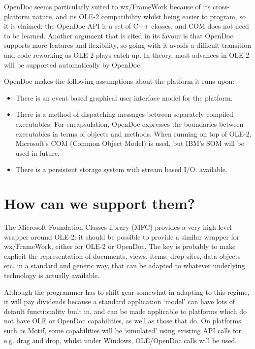 OpenDoc seems particularly suited to wx/FrameWork because of its
cross-platform nature, and its OLE-2 compatibility whilst being easier
to program, so it is claimed: the OpenDoc API is a set of C++
classes, and COM does not need to be learned. Another argument that is
cited in its favour is that OpenDoc supports more features and
flexibility, so going with it avoids a difficult transition and code
reworking as OLE-2 plays catch-up. In theory, most advances in OLE-2
will be supported automatically by OpenDoc.

OpenDoc makes the following assumptions about the platform it runs upon:

\begin{itemize}
\item There is an event based graphical user interface model for the platform.
\item There is a method of dispatching messages between separately compiled
executables. For encapsulation, OpenDoc expresses the boundaries between
executables in terms of objects and methods. When running on top of OLE-2,
Microsoft's COM (Common Object Model) is used, but IBM's SOM will be used in future.
\item There is a persistent storage system with stream based I/O.
available.
\end{itemize}
    
\section{How can we support them?}

The Microsoft Foundation Classes library (MFC) provides a very
high-level wrapper around OLE-2: it should be possible to provide a
similar wrapper for wx/FrameWork, either for OLE-2 or OpenDoc. The key
is probably to make explicit the representation of documents, views,
items, drop sites, data objects etc. in a standard and generic way, that
can be adapted to whatever underlying technology is actually available.

Although the programmer has to shift gear somewhat in adapting to this
regime, it will pay dividends because a standard application `model' can
have lots of default functionality built in, and can be made applicable
to platforms which do not have OLE or OpenDoc capabilities, as well as
those that do. On platforms such as Motif, some capabilities will be
`simulated' using existing API calls for e.g. drag and drop,
whilst under Windows, OLE/OpenDoc calls will be used.

